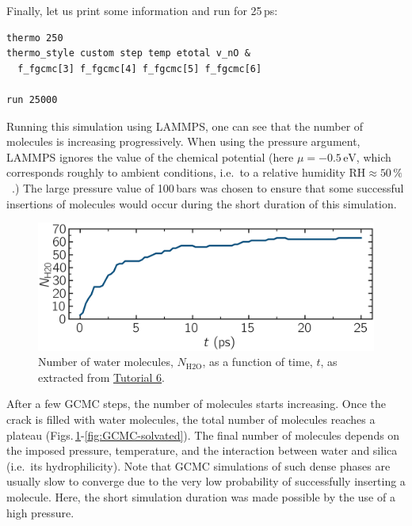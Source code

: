 \documentclass[9pt,tutorial]{livecoms}
\begin{document}
Finally, let us print some information and run for 25\,ps:
\begin{lstlisting}
thermo 250
thermo_style custom step temp etotal v_nO &
  f_fgcmc[3] f_fgcmc[4] f_fgcmc[5] f_fgcmc[6]

run 25000
\end{lstlisting}
Running this simulation using LAMMPS, one can see that the number of molecules is increasing
progressively.  When using the pressure argument, LAMMPS ignores the value of the
chemical potential (here $\mu = -0.5\,\text{eV}$, which corresponds roughly to
ambient conditions, i.e.~to a relative humidity $\text{RH} \approx 50\,\%$~\cite{gravelle2020multi}.)
The large pressure value of 100\,bars was chosen to ensure that some successful
insertions of molecules would occur during the short duration of this simulation.

\begin{figure}
\centering
\includegraphics[width=\linewidth]{GCMC-number}
\caption{Number of water molecules, $N_\text{H2O}$, as a function of time, $t$,
as extracted from \hyperref[gcmc-silica-label]{Tutorial 6}.}
\label{fig:GCMC-number}
\end{figure}

After a few GCMC steps, the number of molecules starts increasing.  Once the
crack is filled with water molecules, the total number of molecules reaches a plateau
(Figs.\,\ref{fig:GCMC-number}-\ref{fig:GCMC-solvated}).  The final number of
molecules depends on the imposed pressure, temperature, and the interaction
between water and silica (i.e.~its hydrophilicity).  Note that GCMC simulations
of such dense phases are usually slow to converge due to the very low probability
of successfully inserting a molecule.  Here, the short simulation duration was
made possible by the use of a high pressure.
\end{document}
